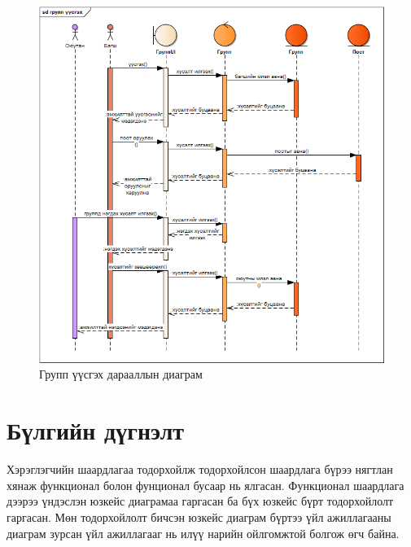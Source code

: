 \begin{figure}
	\centering
	\includegraphics[angle=90, scale=0.65]{Diagrams/sequence_group_vvsgeh}
	\caption[Групп үүсгэх дарааллын диаграм]{Групп үүсгэх дарааллын диаграм}
	\label{text}
\end{figure}
\newpage
\section{Бүлгийн дүгнэлт}
Хэрэглэгчийн шаардлагаа тодорхойлж тодорхойлсон шаардлага бүрээ нягтлан хянаж функционал болон фунционал бусаар нь ялгасан. Функционал шаардлага дээрээ үндэслэн юзкейс диаграмаа гаргасан ба бүх  юзкейс бүрт тодорхойлолт гаргасан. Мөн тодорхойлолт бичсэн юзкейс диаграм бүртээ үйл ажиллагааны диаграм зурсан үйл ажиллагааг нь илүү нарийн ойлгомжтой болгож өгч байна.

